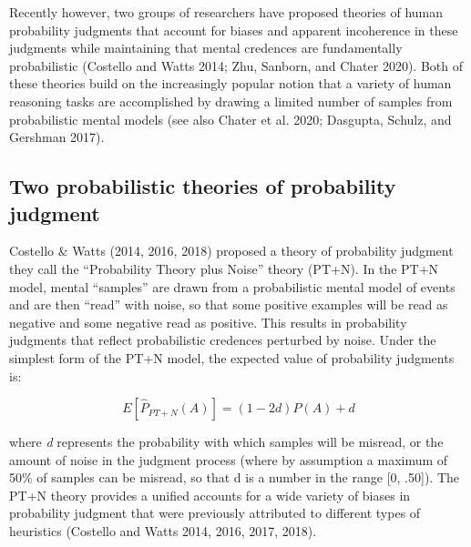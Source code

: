 \documentclass{article}
\begin{document}
Recently however, two groups of researchers have proposed theories of
human probability judgments that account for biases and apparent
incoherence in these judgments while maintaining that mental credences
are fundamentally probabilistic (Costello and Watts 2014; Zhu, Sanborn,
and Chater 2020). Both of these theories build on the increasingly
popular notion that a variety of human reasoning tasks are accomplished
by drawing a limited number of samples from probabilistic mental models
(see also Chater et al. 2020; Dasgupta, Schulz, and Gershman 2017).

\hypertarget{two-probabilistic-theories-of-probability-judgment}{%
\subsection{Two probabilistic theories of probability
judgment}\label{two-probabilistic-theories-of-probability-judgment}}

Costello \& Watts (2014, 2016, 2018) proposed a theory of probability
judgment they call the ``Probability Theory plus Noise'' theory (PT+N).
In the PT+N model, mental ``samples'' are drawn from a probabilistic
mental model of events and are then ``read'' with noise, so that some
positive examples will be read as negative and some negative read as
positive. This results in probability judgments that reflect
probabilistic credences perturbed by noise. Under the simplest form of
the PT+N model, the expected value of probability judgments is:

\[E[\hat{P}_{PT+N}(A)] = (1-2d)P(A) + d \]

where \emph{d} represents the probability with which samples will be
misread, or the amount of noise in the judgment process (where by
assumption a maximum of 50\% of samples can be misread, so that d is a
number in the range {[}0, .50{]}). The PT+N theory provides a unified
accounts for a wide variety of biases in probability judgment that were
previously attributed to different types of heuristics (Costello and
Watts 2014, 2016, 2017, 2018).
\end{document}

